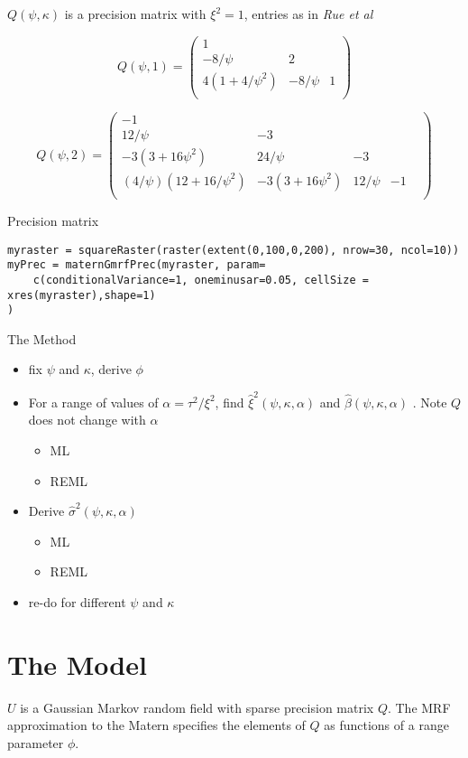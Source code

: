 \documentclass[12pt]{article}
\begin{document}
$Q(\psi,\kappa)$ is a precision matrix with $\xi^2=1$, entries as in \textit{Rue et al}

\[
Q(\psi, 1) =
\begin{pmatrix}
1 & &  \\
-8/\psi & 2 & \\
4(1+4/\psi^2) & -8/\psi & 1 \\
\end{pmatrix}
\]

\[
Q(\psi, 2) =
\begin{pmatrix}
-1 & & & \\
12/\psi & -3 & &\\
-3(3+16\psi^2) & 24/\psi & -3& \\
(4/\psi)(12+16/\psi^2) &-3(3+16\psi^2) & 12/\psi & -1& \\
\end{pmatrix}
\]


Precision matrix
\begin{verbatim}
myraster = squareRaster(raster(extent(0,100,0,200), nrow=30, ncol=10))
myPrec = maternGmrfPrec(myraster, param=
	c(conditionalVariance=1, oneminusar=0.05, cellSize = xres(myraster),shape=1)
)

\end{verbatim}



The Method
\begin{itemize}
  \item fix $\psi$ and $\kappa$, derive  $\phi$
  \item For a range of values of $\alpha = \tau^2/\xi^2$, find
  $\hat\xi^2(\psi, \kappa, \alpha)$ and  $\hat\beta(\psi, \kappa, \alpha)$ .
  Note $Q$ does not change with $\alpha$
  \begin{itemize}
    \item ML
    \item REML
    \end{itemize}
	\item Derive $\hat\sigma^2(\psi, \kappa, \alpha)$
  \begin{itemize}
    \item ML
    \item REML
    \end{itemize}
	\item re-do for different $\psi$ and $\kappa$
\end{itemize}


\section*{The Model}
$U$ is a Gaussian Markov random field with sparse precision matrix $Q$.  The MRF
approximation to the Matern specifies the elements of $Q$ as functions of a
range parameter $\phi$.
\end{document}
